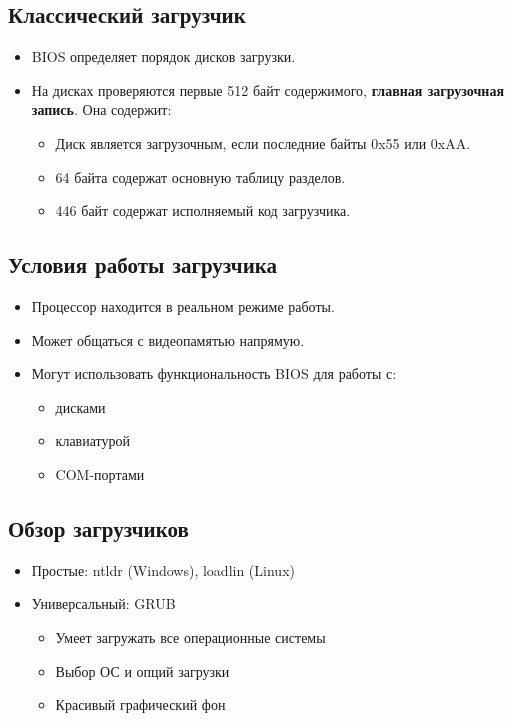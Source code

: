 \subsection{Классический загрузчик}

\begin{itemize}
	\item BIOS определяет порядок дисков загрузки.
	\item На дисках проверяются первые 512 байт содержимого, \textbf{главная загрузочная запись}. Она содержит:
		\begin{itemize}
			\item Диск является загрузочным, если последние байты 0x55 или 0xAA.
			\item 64 байта содержат основную таблицу разделов.
			\item 446 байт содержат исполняемый код загрузчика. 
		\end{itemize}
\end{itemize}

\subsection{Условия работы загрузчика}

\begin{itemize}
	\item Процессор находится в реальном режиме работы.
	\item Может общаться с видеопамятью напрямую.
	\item Могут использовать функциональность BIOS для работы с:
		\begin{itemize}
			\item дисками
			\item клавиатурой
			\item COM-портами
		\end{itemize}
\end{itemize}

\subsection{Обзор загрузчиков}

\begin{itemize}
	\item Простые: ntldr (Windows), loadlin (Linux)
	\item Универсальный: GRUB
		\begin{itemize}
			\item Умеет загружать все операционные системы
			\item Выбор ОС и опций загрузки
			\item Красивый графический фон
		\end{itemize}
\end{itemize}

